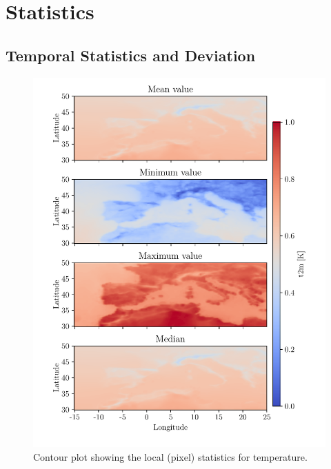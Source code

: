 \appendix
\chapter{Statistics} \label{ch:appendix_statistic}
\section{Temporal Statistics and Deviation} \label{sec:all_stats}
\begin{figure}[ht]
    \centering
    \includegraphics[scale=0.9]{python_figs/all_stat_variable_t2m.pdf}
    \caption{Contour plot showing the local (pixel) statistics for temperature.}
    \label{fig:all_stats_t2m}
\end{figure}
